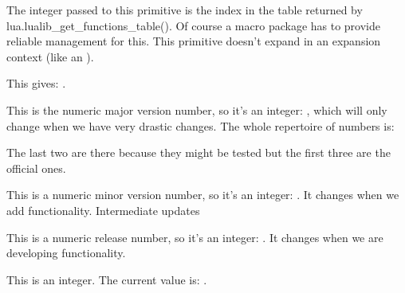 \stopnewprimitive

\startnewprimitive[title={\prm {luafunctioncall}}]

The integer passed to this primitive is the index in the table returned by \typ
{lua.lualib_get_functions_table()}. Of course a macro package has to provide
reliable management for this. This primitive doesn't expand in an expansion
context (like an ).

\stopnewprimitive

\startnewprimitive[title={\prm {luatexbanner}}]

This gives: {\tttf \luatexbanner}.

\stopnewprimitive

\startnewprimitive[title={\prm {luametatexmajorversion}}]

This is the numeric major version number, so it's an integer: \the
\luametatexmajorversion, which will only change when we have very drastic
changes. The whole repertoire of numbers is:

\starttabulate
\NC \type {\the\luametatexmajorversion} \NC \the\luametatexmajorversion \NC \NR
\NC \type {\the\luametatexminorversion} \NC \the\luametatexminorversion \NC \NR
\NC \type {\the\luametatexrelease}      \NC \the\luametatexrelease      \NC \NR
\NC \type {\the\luatexversion}          \NC \the\luatexversion          \NC \NR
\NC \type {\the\luatexrevision}         \NC \the\luatexrevision         \NC \NR
\stoptabulate

The last two are there because they might be tested but the first three are the
official ones.

\stopnewprimitive

\startnewprimitive[title={\prm {luametatexminorversion}}]

This is a numeric minor version number, so it's an integer: \the
\luametatexminorversion. It changes when we add functionality. Intermediate
updates

\stopnewprimitive

\startnewprimitive[title={\prm {luametatexrelease}}]

This is a numeric release number, so it's an integer: \the\luametatexrelease. It
changes when we are developing functionality.

\stopnewprimitive

\startnewprimitive[title={\prm {luatexrevision}}]

This is an integer. The current value is: {\tttf \number\luatexrevision}.

